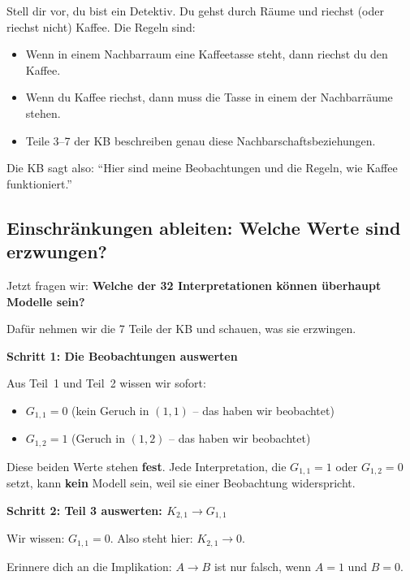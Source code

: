 \documentclass[a4paper,12pt]{article}
\begin{document}
\begin{analogie}[title={Analogie: Detektiv im Geb\"aude}]
Stell dir vor, du bist ein Detektiv. Du gehst durch R\"aume und riechst (oder riechst nicht) Kaffee. Die Regeln sind:
\begin{itemize}
\item Wenn in einem Nachbarraum eine Kaffeetasse steht, dann riechst du den Kaffee.
\item Wenn du Kaffee riechst, dann muss die Tasse in einem der Nachbarr\"aume stehen.
\item Teile 3--7 der KB beschreiben genau diese Nachbarschaftsbeziehungen.
\end{itemize}
Die KB sagt also: "`Hier sind meine Beobachtungen und die Regeln, wie Kaffee funktioniert."'
\end{analogie}


\subsection{Einschr\"ankungen ableiten: Welche Werte sind erzwungen?}

Jetzt fragen wir: \textbf{Welche der 32 Interpretationen k\"onnen \"uberhaupt Modelle sein?}

Daf\"ur nehmen wir die 7 Teile der KB und schauen, was sie erzwingen.

\bigskip
\textbf{Schritt 1: Die Beobachtungen auswerten}

Aus Teil~1 und Teil~2 wissen wir sofort:
\begin{itemize}
\item $G_{1,1} = 0$ (kein Geruch in $(1{,}1)$ -- das haben wir beobachtet)
\item $G_{1,2} = 1$ (Geruch in $(1{,}2)$ -- das haben wir beobachtet)
\end{itemize}

Diese beiden Werte stehen \textbf{fest}. Jede Interpretation, die $G_{1,1} = 1$ oder $G_{1,2} = 0$ setzt, kann \textbf{kein} Modell sein, weil sie einer Beobachtung widerspricht.

\bigskip
\textbf{Schritt 2: Teil 3 auswerten: $K_{2,1} \to G_{1,1}$}

Wir wissen: $G_{1,1} = 0$. Also steht hier: $K_{2,1} \to 0$.

Erinnere dich an die Implikation: $A \to B$ ist nur falsch, wenn $A=1$ und $B=0$.
\end{document}
